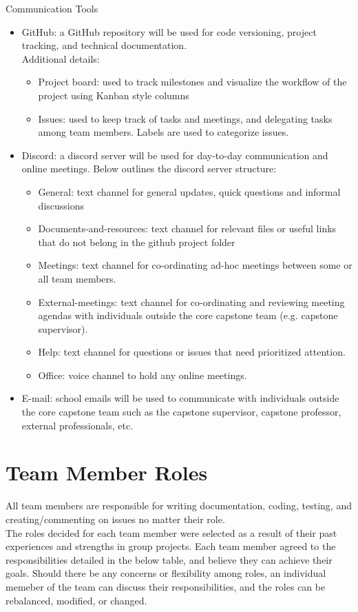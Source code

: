 \documentclass{article}
\begin{document}
Communication Tools
\begin{itemize}
  \item GitHub: a GitHub repository will be used for code versioning, project tracking, and technical documentation.\\
  Additional details:
  \begin{itemize}
    \item Project board: used to track milestones and visualize the workflow of the project using Kanban style columns
    \item Issues: used to keep track of tasks and meetings, and delegating tasks among team members. Labels are used
     to categorize issues.
  \end{itemize}
  \item Discord: a discord server will be used for day-to-day communication and online meetings. Below outlines the 
  discord server structure:
  \begin{itemize}
    \item General: text channel for general updates, quick questions and informal discussions
    \item Documents-and-resources: text channel for relevant files or useful links that do not belong in the github 
    project folder
    \item Meetings: text channel for co-ordinating ad-hoc meetings between some or all team members.
    \item External-meetings: text channel for co-ordinating and reviewing meeting agendas with individuals 
    outside the core capstone team (e.g. capstone supervisor).
    \item Help: text channel for questions or issues that need prioritized attention.
    \item Office: voice channel to hold any online meetings.
  \end{itemize}
  \item E-mail: school emails will be used to communicate with individuals outside the core capstone team such as the 
  capstone supervisor, capstone professor, external professionals, etc.
\end{itemize}

\section{Team Member Roles}

All team members are responsible for writing documentation, coding, testing, and creating/commenting on issues no 
matter their role.\\
\indent The roles decided for each team member were selected as a result of their past experiences and strengths in group projects.
Each team member agreed to the responsibilities detailed in the below table, and believe they can achieve their goals.
Should there be any concerns or flexibility among roles, an individual memeber of the team can discuss their responsibilities,
and the roles can be rebalanced, modified, or changed.\\
\end{document}

